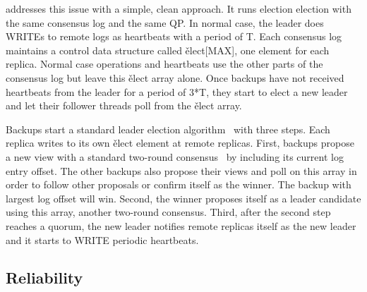 

\xxx addresses this issue with a simple, clean approach. It runs election 
election with the same consensus log and the same QP. In normal case, the leader 
does WRITEs to remote logs as heartbeats with a period of T. Each consensus log 
maintains a control data structure called \v{elect[MAX]}, one element for each 
replica. Normal case operations and heartbeats use the other parts of the 
consensus log but leave this \v{elect} array alone. Once backups have not 
received heartbeats from the leader for a period of 3*T, they start to elect a 
new leader and let their follower threads poll from the \v{elect} array.


Backups start a standard \paxos leader election 
algorithm~\cite{paxos:practical} with three steps. Each replica writes to its 
own \v{elect} element at remote replicas. First, backups propose a new view 
with a standard two-round \paxos consensus~\cite{paxos:simple} by including its 
current log entry offset. The other backups also propose their views and poll 
on this array in order to follow other proposals or confirm itself as the 
winner. The backup with largest log offset will win. Second, the winner 
proposes itself as a leader candidate using this array, another two-round 
\paxos consensus. Third, after the second step reaches a quorum, the new leader 
notifies remote replicas itself as the new leader and it starts to WRITE 
periodic heartbeats.

\subsection{Reliability} \label{sec:guarantees}

